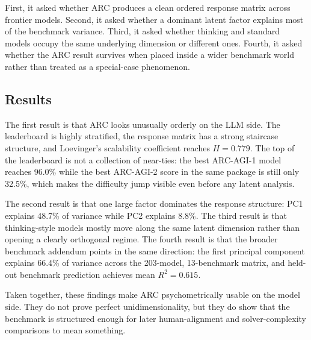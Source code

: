 \documentclass[11pt,letterpaper]{article}
\begin{document}
First, it asked whether ARC produces a clean ordered response matrix across frontier models. Second, it asked whether a dominant latent factor explains most of the benchmark variance. Third, it asked whether thinking and standard models occupy the same underlying dimension or different ones. Fourth, it asked whether the ARC result survives when placed inside a wider benchmark world rather than treated as a special-case phenomenon.

\subsection{Results}

The first result is that ARC looks unusually orderly on the LLM side. The leaderboard is highly stratified, the response matrix has a strong staircase structure, and Loevinger's scalability coefficient reaches $H = 0.779$. The top of the leaderboard is not a collection of near-ties: the best ARC-AGI-1 model reaches 96.0\% while the best ARC-AGI-2 score in the same package is still only 32.5\%, which makes the difficulty jump visible even before any latent analysis.

The second result is that one large factor dominates the response structure: PC1 explains 48.7\% of variance while PC2 explains 8.8\%. The third result is that thinking-style models mostly move along the same latent dimension rather than opening a clearly orthogonal regime. The fourth result is that the broader benchmark addendum points in the same direction: the first principal component explains 66.4\% of variance across the 203-model, 13-benchmark matrix, and held-out benchmark prediction achieves mean $R^2 = 0.615$.

Taken together, these findings make ARC psychometrically usable on the model side. They do not prove perfect unidimensionality, but they do show that the benchmark is structured enough for later human-alignment and solver-complexity comparisons to mean something.
\end{document}
